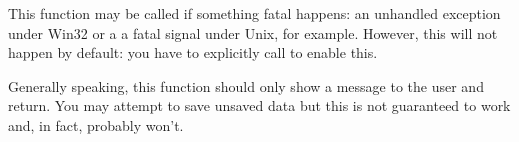 
This function may be called if something fatal happens: an unhandled
exception under Win32 or a a fatal signal under Unix, for example. However,
this will not happen by default: you have to explicitly call 
 to enable this.

Generally speaking, this function should only show a message to the user and
return. You may attempt to save unsaved data but this is not guaranteed to
work and, in fact, probably won't.





